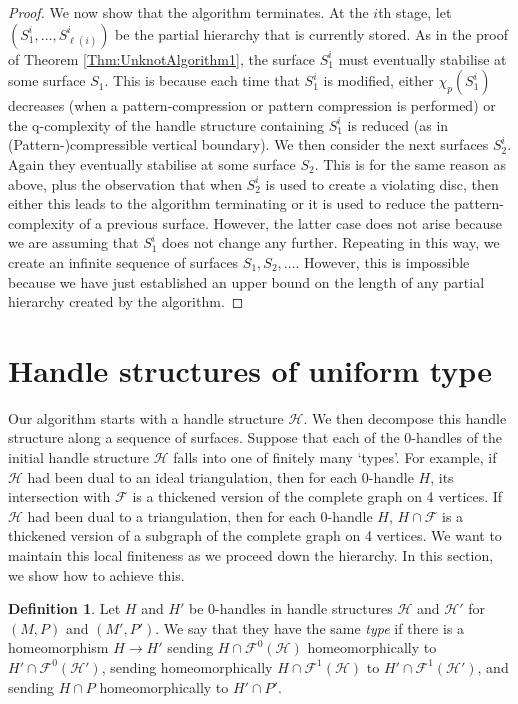 \documentclass[oneside]{amsart}
\numberwithin{equation}{section}
\theoremstyle{plain}
\theoremstyle{definition}
\newtheorem{definition}[equation]{Definition}
\begin{document}
\begin{proof}
We now show that the algorithm terminates.
At the $i$th stage, let
$(S_1^i, \dots, S_{\ell(i)}^i)$
be the partial hierarchy that is currently stored. 
As in the proof of Theorem \ref{Thm:UnknotAlgorithm1}, the surface $S_1^i$ must eventually stabilise at some surface $S_1$. This is because each time that $S_1^i$ is modified, either $\chi_p(S_1^i)$ decreases (when a pattern-compression or pattern compression is performed) or the q-complexity of the handle structure containing $S_1^i$ is reduced (as in {\sc (Pattern-)compressible vertical boundary}). We then consider the next surfaces $S_2^i$. Again they eventually stabilise at some surface $S_2$. This is for the same reason as above, plus the observation that when $S_2^i$ is used to create a violating disc, then either this leads to the algorithm terminating or it is used to reduce the pattern-complexity of a previous surface. However, the latter case does not arise because we are assuming that $S_1^i$ does not change any further. Repeating in this way, we create an infinite sequence of surfaces $S_1, S_2, \dots$. However, this is impossible because we have just established an upper bound on the length of any partial hierarchy created by the algorithm.
\end{proof}



\section{Handle structures of uniform type}
\label{Sec:UniformType}

Our algorithm starts with a handle structure $\mathcal{H}$. We then decompose this handle structure along a sequence of surfaces. Suppose that each of the 0-handles of the initial handle structure $\mathcal{H}$ falls into one of finitely many `types'. For example, if $\mathcal{H}$ had been dual to an ideal triangulation, then for each 0-handle $H$, its intersection with $\mathcal{F}$ is a thickened version of the complete graph on 4 vertices. If $\mathcal{H}$ had been dual to a triangulation, then for each 0-handle $H$, $H \cap \mathcal{F}$ is a thickened version of a subgraph of the complete graph on 4 vertices. We want to maintain this local finiteness as we proceed down the hierarchy. In this section, we show how to achieve this.

\begin{definition}
Let $H$ and $H'$ be 0-handles in handle structures $\mathcal{H}$ and $\mathcal{H}'$ for $(M,P)$ and $(M', P')$. We say that they have the same \emph{type} if there is a homeomorphism $H \rightarrow H'$ sending $H \cap \mathcal{F}^0(\mathcal{H})$ homeomorphically to $H' \cap \mathcal{F}^0(\mathcal{H}')$, sending homeomorphically $H \cap \mathcal{F}^1(\mathcal{H})$ to $H' \cap \mathcal{F}^1(\mathcal{H}')$, and sending $H \cap P$ homeomorphically  to $H' \cap P'$.
\end{definition}
\end{document}
